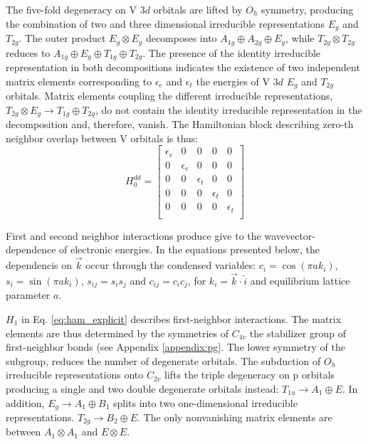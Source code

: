 \documentclass[twocolumn,showpacs,preprintnumbers,superscriptaddress,prb,floatfix,aps,10pt]{revtex4-1}
\begin{document}
The five-fold degeneracy on V 3$d$ orbitals are lifted by $O_h$ symmetry, producing the combination of two and three dimensional irreducible representations $E_g$ and $T_{2g}$. The outer product $E_g \otimes E_g$ decomposes into $A_{1g} \oplus A_{2g} \oplus E_g$, while $T_{2g} \otimes T_{2g}$ reduces to $ A_{1g} \oplus E_{g} \oplus T_{1g} \oplus T_{2g}$. The presence of the identity irreducible representation in both decompositions indicates the existence of two independent matrix elements corresponding to $\epsilon_e$ and $\epsilon_t$ the energies of V 3$d$ $E_g$ and $T_{2g}$ orbitals. Matrix elements coupling the different irreducible representations, $T_{2g} \otimes E_g \rightarrow T_{1g} \oplus T_{2g}$, do not contain the identity irreducible representation in the decomposition and, therefore, vanish. The Hamiltonian block describing zero-th neighbor overlap between V orbitals is thus:
\begin{equation}
H_0^{dd} =
\begin{bmatrix}
 \epsilon_{e} & 0 & 0 & 0 & 0 \\
 0 & \epsilon_{e} & 0 & 0 & 0 \\
 0 & 0 & \epsilon_{t} & 0 & 0 \\
 0 & 0 & 0 & \epsilon_{t} & 0 \\
 0 & 0 & 0 & 0 & \epsilon_{t} \\
\end{bmatrix}
\end{equation}

First and second neighbor interactions produce give to the wavevector-dependence of electronic energies. In the equations presented below, the dependencis on $\vec{k}$ occur through the condensed variables: $c_i = \cos(\pi a k_i)$, $s_i = \sin(\pi a k_i)$, $s_{ij} = s_i s_j$ and $c_{ij} = c_i c_j$, for $k_i = \vec{k}\cdot\hat{i}$ and equilibrium lattice parameter $a$.

$H_1$ in Eq. \ref{eq:ham_explicit} describes first-neighbor interactions. 
The matrix elements are thus determined by the symmetries of $C_{4v}$ the stabilizer group of first-neighbor bonds (see Appendix \ref{appendix:pg}. The lower symmetry of the subgroup, reduces the number of degenerate orbitals. The subduction of $O_h$ irreducible representations onto $C_{2v}$ lifts the triple degeneracy on p orbitals producing a single and two double degenerate orbitals instead: $T_{1u} \rightarrow A_1 \oplus E$. In addition, $E_g \rightarrow A_1 \oplus B_1$ splits into two one-dimensional irreducible representations. $T_{2g} \rightarrow B_2 \oplus E$. The only nonvanishing matrix elements are between $A_1 \otimes A_1$ and $E \otimes E$.
\end{document}
